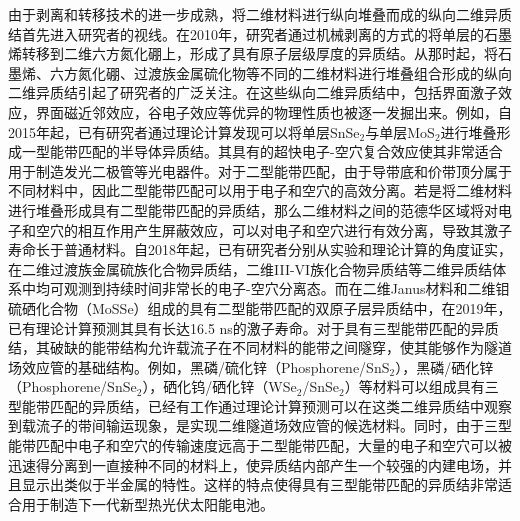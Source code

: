     由于剥离和转移技术的进一步成熟，将二维材料进行纵向堆叠而成的纵向二维异质结首先进入研究者的视线。在2010年，研究者通过机械剥离的方式的将单层的石墨烯转移到二维六方氮化硼上，形成了具有原子层级厚度的异质结。从那时起，将石墨烯、六方氮化硼、过渡族金属硫化物等不同的二维材料进行堆叠组合形成的纵向二维异质结引起了研究者的广泛关注。在这些纵向二维异质结中，包括界面激子效应，界面磁近邻效应，谷电子效应等优异的物理性质也被逐一发掘出来。例如，自2015年起，已有研究者通过理论计算发现可以将单层SnSe$_2$与单层MoS$_2$进行堆叠形成一型能带匹配的半导体异质结。其具有的超快电子-空穴复合效应使其非常适合用于制造发光二极管等光电器件。对于二型能带匹配，由于导带底和价带顶分属于不同材料中，因此二型能带匹配可以用于电子和空穴的高效分离。若是将二维材料进行堆叠形成具有二型能带匹配的异质结，那么二维材料之间的范德华区域将对电子和空穴的相互作用产生屏蔽效应，可以对电子和空穴进行有效分离，导致其激子寿命长于普通材料。自2018年起，已有研究者分别从实验和理论计算的角度证实，在二维过渡族金属硫族化合物异质结，二维III-VI族化合物异质结等二维异质结体系中均可观测到持续时间非常长的电子-空穴分离态。而在二维Janus材料和二维钼硫硒化合物（MoSSe）组成的具有二型能带匹配的双原子层异质结中，在2019年，已有理论计算预测其具有长达16.5 ns的激子寿命。对于具有三型能带匹配的异质结，其破缺的能带结构允许载流子在不同材料的能带之间隧穿，使其能够作为隧道场效应管的基础结构。例如，黑磷/硫化锌（Phosphorene/SnS$_2$），黑磷/硒化锌（Phosphorene/SnSe$_2$），硒化钨/硒化锌（WSe$_2$/SnSe$_2$）等材料可以组成具有三型能带匹配的异质结，已经有工作通过理论计算预测可以在这类二维异质结中观察到载流子的带间输运现象，是实现二维隧道场效应管的候选材料。同时，由于三型能带匹配中电子和空穴的传输速度远高于二型能带匹配，大量的电子和空穴可以被迅速得分离到一直接种不同的材料上，使异质结内部产生一个较强的内建电场，并且显示出类似于半金属的特性。这样的特点使得具有三型能带匹配的异质结非常适合用于制造下一代新型热光伏太阳能电池。

